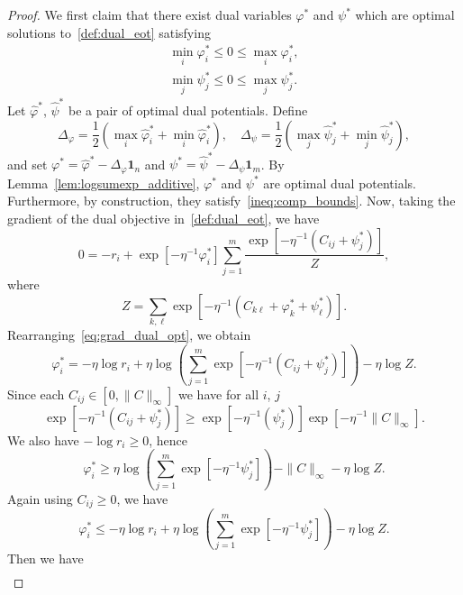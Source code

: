 \documentclass[10pt]{article}
\theoremstyle{plain}
\theoremstyle{definition}
\theoremstyle{remark}
\newcommand{\one}{\mathbf{1}}
\begin{document}
\begin{proof}
    We first claim that there exist dual variables $\varphi^*$ and $\psi^*$ which are optimal solutions to~\eqref{def:dual_eot} satisfying
    \begin{align}
        \nonumber\min_i\varphi^*_i\leq 0\leq \max_i\varphi^*_i,\\
        \min_j\psi^*_j\leq 0\leq \max_j\psi^*_j.\label{ineq:comp_bounds}
    \end{align}
    Let $\hat\varphi^*$, $\hat\psi^*$ be a pair of optimal dual potentials. Define \[
        \Delta_\varphi=\frac{1}{2}(\max_i\hat\varphi_i^*+\min_i\hat\varphi_i^*),\quad
        \Delta_\psi=\frac{1}{2}(\max_j\hat\psi_j^*+\min_j\hat\psi_j^*),
    \]
    and set $\varphi^*=\hat\varphi^* - \Delta_\varphi\one_n$ and $\psi^*=\hat\psi^* - \Delta_\psi\one_m$.
    By Lemma~\ref{lem:logsumexp_additive}, $\varphi^*$ and $\psi^*$ are optimal dual potentials. Furthermore, by construction, they satisfy~\eqref{ineq:comp_bounds}.
    Now, taking the gradient of the dual objective in~\eqref{def:dual_eot}, we have
    \begin{equation}\label{eq:grad_dual_opt}
        0=-r_i +\exp[-\eta ^{-1}\varphi^*_i]\sum_{j=1}^m\frac{\exp[-\eta ^{-1}(C_{ij}+\psi^*_j)]}{Z},
    \end{equation}
    where
    \[Z=\sum_{k,\ell}\exp[-\eta ^{-1}(C_{k\ell}+\varphi^*_k+\psi^*_\ell)].\]
    Rearranging~\eqref{eq:grad_dual_opt}, we obtain
    \begin{equation*}
        \varphi^*_i=-\eta \log r_i + \eta \log\left(\sum_{j=1}^m\exp[-\eta ^{-1}(C_{ij}+\psi^*_j)]\right) - \eta \log Z.
    \end{equation*}
    Since each $C_{ij}\in[0, \|C\|_\infty]$ we have for all $i$, $j$
    \begin{equation*}
    \exp[-\eta ^{-1}(C_{ij}+\psi^*_j)]\geq \exp[-\eta ^{-1}(\psi^*_j)]\exp[-\eta ^{-1}\|C\|_\infty].
    \end{equation*}
    We also have $-\log r_i\geq 0$, hence
    \begin{equation*}
        \varphi^*_i\geq  \eta \log\left(\sum_{j=1}^m\exp[-\eta ^{-1}\psi^*_j]\right) -\|C\|_\infty - \eta \log Z.
    \end{equation*}
    Again using $C_{ij}\geq 0$, we have
    \begin{equation*}
        \varphi^*_i\leq -\eta \log r_i + \eta \log\left(\sum_{j=1}^m\exp[-\eta ^{-1}\psi^*_j]\right) - \eta \log Z.
    \end{equation*}
    Then we have
    \begin{align*}

\end{align*}
\end{proof}
\end{document}
